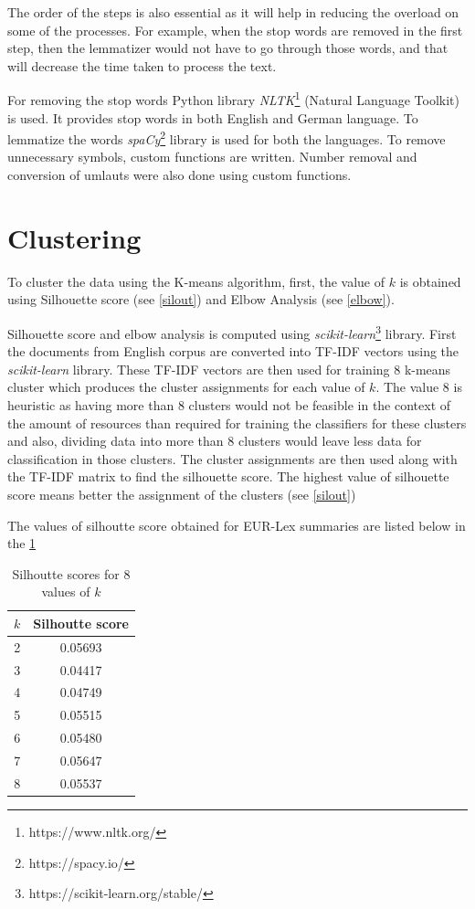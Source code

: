 The order of the steps is also essential as it will help in reducing the overload on some of the processes. For example, when the stop words are removed in the first step, then the lemmatizer would not have to go through those words, and that will decrease the time taken to process the text. 

For removing the stop words Python library \textit{NLTK}\footnote{https://www.nltk.org/} (Natural Language Toolkit) is used. It provides stop words in both English and German language. To lemmatize the words \textit{spaCy}\footnote{https://spacy.io/} library is used for both the languages. To remove unnecessary symbols, custom functions are written. Number removal and conversion of umlauts were also done using custom functions.


\section{Clustering} \label{clustering}

To cluster the data using the K-means algorithm, first, the value of $k$ is obtained using Silhouette score (see \ref{silout})  and Elbow Analysis (see \ref{elbow}). 

Silhouette score and elbow analysis is computed using \textit{scikit-learn}\footnote{https://scikit-learn.org/stable/} library. First the documents from English corpus are converted into \gls{TF-IDF} vectors using the \textit{scikit-learn} library. These \gls{TF-IDF} vectors are then used for training $8$ k-means cluster which produces the cluster assignments for each value of $k$. The value 8 is heuristic as having more than 8 clusters would not be feasible in the context of the amount of resources than required for training the classifiers for these clusters and also, dividing data into more than 8 clusters would leave less data for classification in those clusters. The cluster assignments are then used along with the \gls{TF-IDF} matrix to find the silhouette score. The highest value of silhouette score means better the assignment of the clusters (see \ref{silout})

The values of silhoutte score obtained for EUR-Lex summaries are listed below in the \ref{table:silhoutteScore}
\begin{table}[!ht]
\centering
\begin{tabular}{cc}
\hline
$k$ & Silhoutte score \\ \hline
2 & 0.05693 \\
3 & 0.04417 \\
4 & 0.04749 \\
5 & 0.05515 \\
6 & 0.05480 \\
7 & 0.05647 \\
8 & 0.05537 \\ \hline
\end{tabular}
\captionsetup{justification=centering,margin=1cm}
\caption{Silhoutte scores for 8 values of $k$}
\label{table:silhoutteScore}
\end{table}

